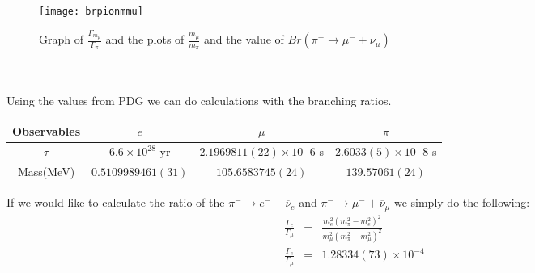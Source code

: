 \documentclass[12pt]{article}
\def \bea{\begin{eqnarray}}
\def \eea{\end{eqnarray}}
\def \[{\left[}
\def \onu{\overline{\nu}}
\def \Ga{\Gamma}
\begin{document}
\begin{enumerate}
\begin{figure}[h]
\centering
\texttt{[image: brpionmmu]}
\caption{Graph of $\frac{\Ga_{m_\mu}}{\Ga_\pi}$ and the plots of $\frac{m_\mu}{m_\pi}$ and the value of $Br(\pi^{-} \rightarrow \mu^{-} + \nu_\mu)$}
\end{figure}
\\ 
\\
Using the values from PDG \cite{Agashe:2014kda} we can do calculations with the branching ratios. \\
\begin{center}
 \begin{tabular}{||c c c c||} 
 \hline
 Observables & $e$ & $\mu$ & $\pi$  \\ [0.5ex] 
 \hline\hline
 $\tau$ & $6.6 \times 10^{28}$ yr &$2.1969811(22) \times 10^-6$ s  & $2.6033(5) \times 10^-8$ s \\ 
 \hline
 Mass(MeV) & $0.5109989461(31)$ & $105.6583745(24)$  & $139.57061(24)$ \\[1ex] 
 \hline
\end{tabular}
\end{center}
If we would like to calculate the ratio of the $\pi^- \rightarrow e^- + \onu_e$ and  $\pi^- \rightarrow \mu^- + \onu_\mu$ we simply do the following: 
\bea 
\frac{\Ga_e}{\Ga_\mu} &=& \frac{m_e^2(m_\pi^2-m_e^2)^2}{m_\mu^2(m_\pi^2-m_\mu^2)^2}\\
\frac{\Ga_e}{\Ga_\mu} &=& 1.28334(73) \times 10^{-4}
\eea 
\newpage

\end{enumerate}
\end{document}
